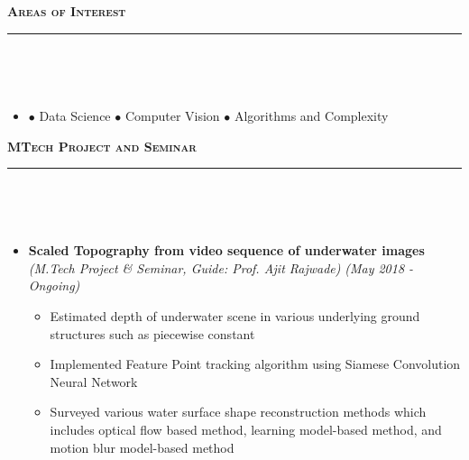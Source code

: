 \documentclass[a4paper,10pt]{article}
\newcommand{\isep}{-2 pt}
\newcommand{\lsep}{-0.5cm}
\newcommand{\resheading}[1]{{\small
        {
            \begin{minipage}
                {0.992\textwidth}\textbf{{\textsc{#1 \vphantom{p\^{E}} }}}
                \\[-0.3cm]
                \hrule
            \end{minipage}
            \\[-0.5cm]
        }
 }}
\begin{document}
\hspace{0.2cm}\\
\hspace{0.2cm}\\
\hspace{0.2cm}\\
\hspace{0.2cm}\\
\hspace{0.2cm}\\
\hspace{0.2cm}\\
\hspace{0.2cm}\\
\hspace{0.2cm}\\
\hspace{0.2cm}\\
\hspace{0.2cm}\\
\hspace{0.2cm}\\
\hspace{0.2cm}\\
\resheading{\textbf{\large Areas of Interest}}\\[\lsep]
    \begin{itemize}
    \item[] 
    \hspace{-0.4cm} $\bullet$ Data Science
    \hspace{0.2cm} $\bullet$ Computer Vision
   \hspace{0.2cm} $\bullet$ Algorithms and Complexity
\end{itemize}
\resheading{\textbf{\large MTech Project and Seminar}}\\[-0.4cm] 
\begin{itemize}
\item \textbf{Scaled Topography from video sequence of underwater images}  \\
    \emph{(M.Tech Project \& Seminar, Guide: Prof. Ajit Rajwade)} \hfill {\emph{(May 2018 - Ongoing)}}
    \\ [-0.6cm]
      \begin{itemize}\itemsep \isep
        \item Estimated depth of underwater scene in various underlying ground structures such as piecewise constant
        \item Implemented Feature Point tracking algorithm using Siamese Convolution Neural Network
        \item Surveyed various water surface shape reconstruction methods which includes optical flow based method, learning model-based method, and motion blur model-based method
    \\ [-0.6cm]
      \end{itemize}
\end{itemize}
\end{document}
